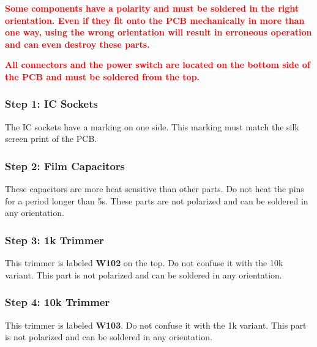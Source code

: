 \documentclass{scrartcl}
\begin{document}
\vspace{0.25cm}

\begin{tcolorbox}
    \textcolor{red}{
        \textbf{Some components have a polarity and must be soldered in the right orientation. Even if they fit onto the PCB mechanically in more than one way, using the wrong orientation will result in erroneous operation and can even destroy these parts.}
    }
\end{tcolorbox}

\vspace{0.25cm}

\begin{tcolorbox}
    \textcolor{red}{
        \textbf{All connectors and the power switch are located on the bottom side of the PCB and must be soldered from the top.}
    }
\end{tcolorbox}

\subsubsection{Step 1: IC Sockets}

The IC sockets have a marking on one side. This marking must match the silk screen print of the PCB.

\subsubsection{Step 2: Film Capacitors}

These capacitors are more heat sensitive than other parts. Do not heat the pins for a period longer than 5s. These parts are not polarized and can be soldered in any orientation.

\subsubsection{Step 3: 1k Trimmer}

This trimmer is labeled \textbf{W102} on the top. Do not confuse it with the 10k variant. This part is not polarized and can be soldered in any orientation.

\subsubsection{Step 4: 10k Trimmer}

This trimmer is labeled \textbf{W103}. Do not confuse it with the 1k variant. This part is not polarized and can be soldered in any orientation.
\end{document}
